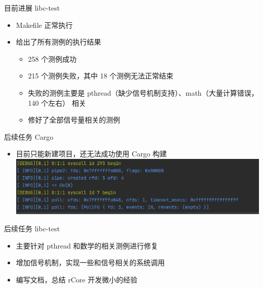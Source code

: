 \documentclass{beamer}
\begin{document}
\begin{frame}{目前进展}
    {libc-test}
    \begin{itemize}
        \setlength{\itemsep}{10pt}
        \item Makefile 正常执行
        \item 给出了所有测例的执行结果
        \begin{itemize}
            \setlength{\itemsep}{10pt}
            \item 258 个测例成功
            \item 215 个测例失败，其中 18 个测例无法正常结束
            \item 失败的测例主要是 pthread（缺少信号机制支持）、math（大量计算错误，140 个左右） 相关
            \item 修好了全部信号量相关的测例
        \end{itemize}
    \end{itemize}
\end{frame}

\begin{frame}{后续任务}
    {Cargo}
    \begin{itemize}
        \setlength{\itemsep}{10pt}
        \item 目前只能新建项目，还无法成功使用 Cargo 构建
        \includegraphics[width=\linewidth]{assets/cargo.png}
        \begin{figure}[htbp]
            \centering
        \end{figure}
    \end{itemize}
\end{frame}

\begin{frame}{后续任务}
    {libc-test}
    \begin{itemize}
        \setlength{\itemsep}{10pt}
        \item 主要针对 pthread 和数学的相关测例进行修复
        \item 增加信号机制，实现一些和信号相关的系统调用
        \item 编写文档，总结 rCore 开发微小的经验
    \end{itemize}
\end{frame}
\end{document}
